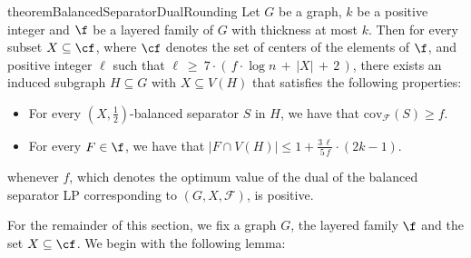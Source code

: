 \begin{restatable}{theorem}{BalancedSeparatorDualRounding}\label{thm:balanced_separator_dual_rounding}
    Let $G$ be a graph, $k$ be a positive integer and $\f$ be a layered family of $G$ with thickness at most $k$. Then for every subset $X \subseteq \cf$, where $\cf$ denotes the set of centers of the elements of $\f$, and positive integer $\ell$ such that $\ell\ \geq\ 7 \cdot (\,f \cdot \log n\, +\, |X|\, +\, 2\,)$, there exists an induced subgraph $H \subseteq G$ with $X \subseteq V(H)$ that satisfies the following properties:
    \begin{itemize}
        \item For every $(X,\frac{1}{2})$-balanced separator $S$ in $H$, we have that $\mathrm{cov}_{\mathcal{F}}(S) \geq f$.
        \item For every $F\in\f$, we have that $|F\cap V(H)|\leq 1 + \frac{3\, \ell}{5\, f}\cdot (2k-1)$.
    \end{itemize}
    whenever $f$, which denotes the optimum value of the dual of the balanced separator LP corresponding to $(G, X, \mathcal{F})$, is positive.
\end{restatable}

For the remainder of this section, we fix a graph $G$, the layered family $\f$ and the set $X\subseteq \cf$. We begin with the following lemma:

